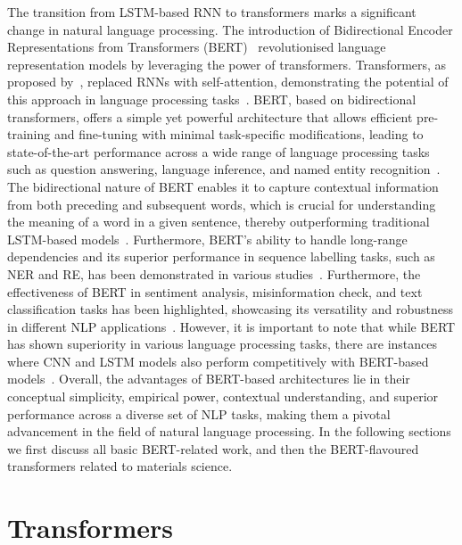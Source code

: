 The transition from LSTM-based RNN to transformers marks a significant change in natural language processing. The introduction of Bidirectional Encoder Representations from Transformers (BERT)~\cite{devlin2018bert} revolutionised language representation models by leveraging the power of transformers. Transformers, as proposed by~\cite{devlin2018bert}, replaced RNNs with self-attention, demonstrating the potential of this approach in language processing tasks~\cite{vaswani2017attention}. 
BERT, based on bidirectional transformers, offers a simple yet powerful architecture that allows efficient pre-training and fine-tuning with minimal task-specific modifications, leading to state-of-the-art performance across a wide range of language processing tasks such as question answering, language inference, and named entity recognition~\cite{devlin2018bert, joshi2019bert}. The bidirectional nature of BERT enables it to capture contextual information from both preceding and subsequent words, which is crucial for understanding the meaning of a word in a given sentence, thereby outperforming traditional LSTM-based models~\cite{lee2019biobert, joshi2020deep}. Furthermore, BERT's ability to handle long-range dependencies and its superior performance in sequence labelling tasks, such as NER and RE, has been demonstrated in various studies~\cite{jung2021dg, hafiane2020experiments,kim2020korean}. Furthermore, the effectiveness of BERT in sentiment analysis, misinformation check, and text classification tasks has been highlighted, showcasing its versatility and robustness in different NLP applications~\cite{ng2022modelling, shreyashree2022bert, taha2023automated}. 
However, it is important to note that while BERT has shown superiority in various language processing tasks, there are instances where CNN and LSTM models also perform competitively with BERT-based models~\cite{joshi2021evaluation,velankar2021hate}. 
Overall, the advantages of BERT-based architectures lie in their conceptual simplicity, empirical power, contextual understanding, and superior performance across a diverse set of NLP tasks, making them a pivotal advancement in the field of natural language processing. In the following sections we first discuss all basic BERT-related work, and then the BERT-flavoured transformers related to materials science. 

\section{Transformers}

